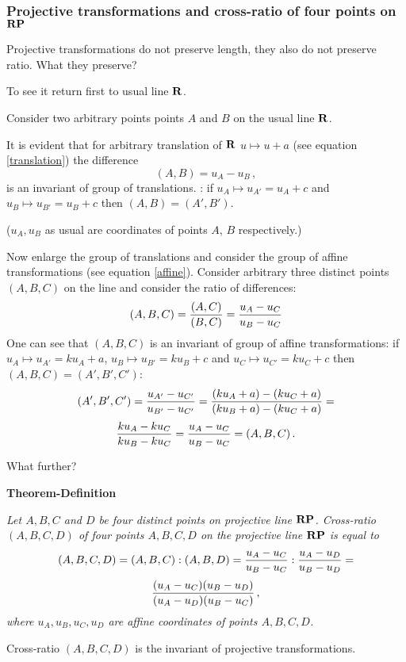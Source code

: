 \documentclass[12pt]{article}
\numberwithin{equation}{section}
\begin{document}
\subsubsection {Projective transformations and cross-ratio
of four points on ${\bf R}{\bf P}$}

          Projective transformations do not preserve length, they
also do not preserve ratio.  What they preserve?


To see it return first to usual line  ${\bf R}$.

Consider two arbitrary points points $A$ and
 $B$ on the usual line ${\bf R}$.

It is evident  that for arbitrary translation of ${\bf R}$
$u\mapsto u+a$ (see equation \eqref{translation})
the difference
                 \begin{equation*}
                  (A,B)= u_A-u_B\,,
                \end{equation*}
 is an invariant of group of translations.
: if 
$u_A\mapsto u_{A'}=u_A+c$ and
$u_B\mapsto u_{B'}=u_B+c$
then  $(A,B)=(A',B')$.

($u_A,u_B$ as usual are coordinates of points $A$, $B$ 
respectively.)


Now enlarge the group of translations and consider
the group of affine transformations
(see equation \eqref{affine}).
Consider arbitrary three distinct points $(A,B,C)$ 
on the line and consider the ratio of differences:
              \begin{equation}\label{ratio}
             (A,B,C)={(A,C)\over (B,C)}=
 {u_A-u_C\over u_B-u_C}
              \end{equation}
One can see that $(A,B,C)$ is an
invariant of group of affine transformations:
if $u_A\mapsto u_{A'}=ku_A+a$,
$u_B\mapsto u_{B'}=ku_B+c$ and
$u_C\mapsto u_{C'}=ku_C+c$
then  $(A,B,C)=(A',B',C')$:
           $$
(A',B',C')=
 {u_{A'}-u_{C'}\over u_{B'}-u_{C'}}=
 {(ku_A+a)-(ku_{C}+a)\over (ku_{B}+a)-(ku_{C}+a)}=
          $$
          $$
 {ku_A-ku_{C}\over ku_{B}-ku_{C}}=
 {u_A-u_{C}\over u_{B}-u_{C}}=
    (A,B,C)\,.
           $$

What further?


\m


{\bf Theorem-Definition}  
{\it Let $A,B,C$ and $D$ be four distinct points
on projective line ${\bf R}{\bf P}$.
 {\it Cross-ratio} $(A,B,C,D)$ of four points
$A,B,C,D$ on the projective line ${\bf R}{\bf P}$ is equal to
             $$
(A,B,C,D)=(A,B,C):(A,B,D)=
          {u_A-u_C\over u_B-u_C}:
          {u_A-u_D\over u_B-u_D}=
                $$
               \begin{equation}\label{crossratioaffine}
           {(u_A-u_C)(u_B-u_D)\over (u_A-u_D)(u_B-u_C)}\,,
                  \end{equation}
where $u_A,u_B,u_C,u_D$ are affine coordinates of points $A,B,C,D$.


Cross-ratio $(A,B,C,D)$ is the invariant of projective transformations.

}
\end{document}
